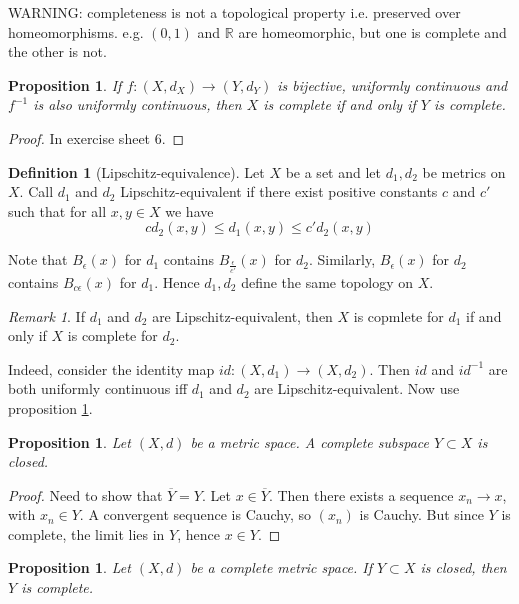 \documentclass{article}
\theoremstyle{definition}
\newtheorem{defn}{Definition}[section]
\theoremstyle{plain}%
\newtheorem{prop}[thm]{Proposition}
\theoremstyle{remark}
\newtheorem*{rem}{Remark}
\newcommand{\R}{\mathbb{R}}
\begin{document}
WARNING: completeness is not a topological property i.e. preserved over homeomorphisms. e.g. $(0,1)$ and $\R$ are homeomorphic, but one is complete and the other is not.

\begin{prop}\label{Completeness preserved map}
    If $f : (X, d_X) \to (Y, d_Y)$ is bijective, uniformly continuous and $f^{-1}$ is also uniformly continuous, then $X$ is complete if and only if $Y$ is complete.
\end{prop}

\begin{proof}
     In exercise sheet 6.
\end{proof}

\begin{defn}[Lipschitz-equivalence]
    Let $X$ be a set and let $d_1, d_2$ be metrics on $X$. Call $d_1$ and $d_2$ Lipschitz-equivalent if there exist positive constants $c$ and $c'$ such that for all $x, y \in X$ we have
    \[c d_2(x,y) \le d_1(x,y) \le c'd_2(x,y)\]
\end{defn}

 Note that $B_{\epsilon}(x)$ for $d_1$ contains $B_{\frac{\epsilon}{c'}}(x)$ for $d_2$. Similarly, $B_\epsilon(x)$ for $d_2$ contains $B_{c \epsilon}(x)$ for $d_1$. Hence $d_1, d_2$ define the same topology on $X$.

\begin{rem}
   If $d_1$ and $d_2$ are Lipschitz-equivalent, then $X$ is copmlete for $d_1$ if and only if $X$ is complete for $d_2$.
\end{rem}

Indeed, consider the identity map  $id: (X, d_1) \to (X, d_2)$. Then $id$ and $id^{-1}$ are both uniformly continuous iff $d_1$ and $d_2$ are Lipschitz-equivalent. Now use proposition \ref{Completeness preserved map}.

\begin{prop}
    Let $(X,d)$ be a metric space. A complete subspace $Y \subset X$ is closed.
\end{prop}

\begin{proof}
     Need to show that $\overline{Y} = Y$. Let $x \in \overline{Y}$. Then there exists a sequence $x_n \to x$, with $x_n \in Y$. A convergent sequence is Cauchy, so $(x_n)$ is Cauchy. But since $Y$ is complete, the limit lies in $Y$, hence $x \in Y$.  
\end{proof}

\begin{prop}
    Let $(X,d)$ be a complete metric space. If $Y \subset X$ is closed, then $Y$ is complete.
\end{prop}
\end{document}
